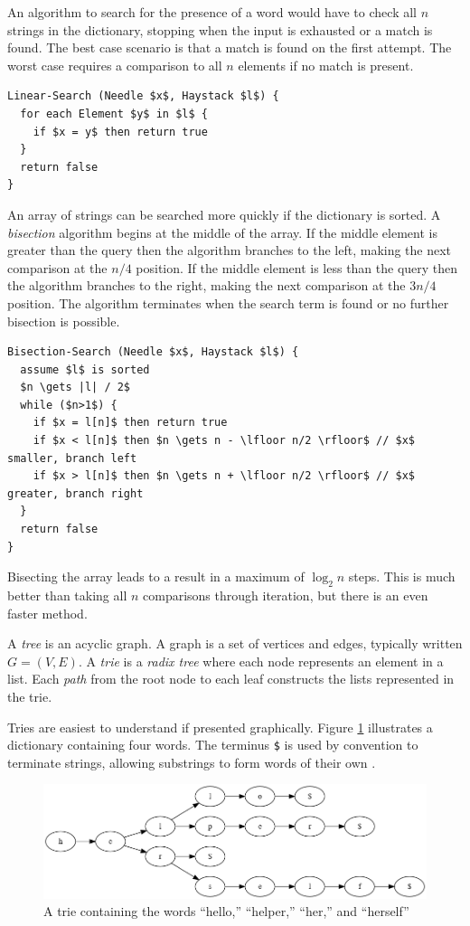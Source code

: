 \documentclass{book}
\begin{document}
An algorithm to search for the presence of a word would have to check all $n$ strings in the dictionary, stopping when the input is exhausted or a match is found. The best case scenario is that a match is found on the first attempt. The worst case requires a comparison to all $n$ elements if no match is present.

\begin{lstlisting}[mathescape]
Linear-Search (Needle $x$, Haystack $l$) {
  for each Element $y$ in $l$ {
    if $x = y$ then return true
  }  
  return false
}
\end{lstlisting}

An array of strings can be searched more quickly if the dictionary is sorted. A \textit{bisection} algorithm begins at the middle of the array. If the middle element is greater than the query then the algorithm branches to the left, making the next comparison at the $n/4$ position. If the middle element is less than the query then the algorithm branches to the right, making the next comparison at the $3n/4$ position. The algorithm terminates when the search term is found or no further bisection is possible.

\begin{lstlisting}[mathescape]
Bisection-Search (Needle $x$, Haystack $l$) {
  assume $l$ is sorted
  $n \gets |l| / 2$
  while ($n>1$) {
    if $x = l[n]$ then return true
    if $x < l[n]$ then $n \gets n - \lfloor n/2 \rfloor$ // $x$ smaller, branch left
    if $x > l[n]$ then $n \gets n + \lfloor n/2 \rfloor$ // $x$ greater, branch right
  }
  return false
}
\end{lstlisting}

Bisecting the array leads to a result in a maximum of $\log_2 n$ steps. This is much better than taking all $n$ comparisons through iteration, but there is an even faster method.

A \textit{tree} is an acyclic graph. A graph is a set of vertices and edges, typically written $G=(V,E)$. A \textit{trie} is a \textit{radix tree} where each node represents an element in a list. Each \textit{path} from the root node to each leaf constructs the lists represented in the trie.

Tries are easiest to understand if presented graphically. Figure \ref{h4} illustrates a dictionary containing four words. The terminus \texttt{\$} is used by convention to terminate strings, allowing substrings to form words of their own \cite{demainelecture}.

\begin{figure}[ht]
\centering
\includegraphics[width=5in]{ch-trie/hello_helper_her_herself}
\caption{A trie containing the words ``hello,'' ``helper,'' ``her,'' and ``herself''}
\label{h4}
\end{figure}
\end{document}
